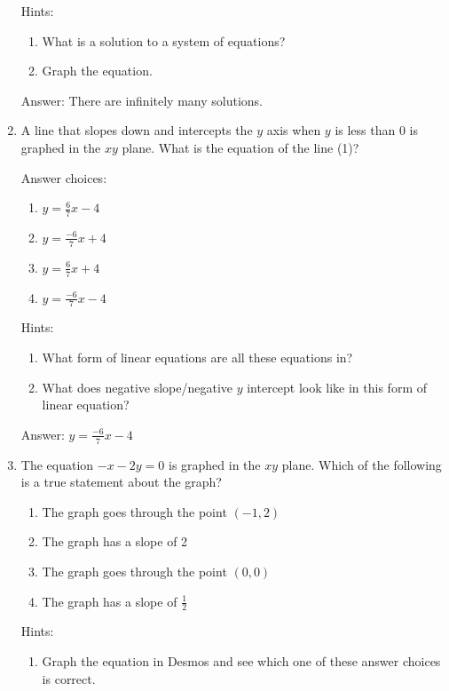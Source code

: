 \documentclass{article}
\begin{document}
\begin{enumerate}
{	      Hints:
	      \begin{enumerate}
		      \item{What is a solution to a system of equations?}
		      \item {Graph the equation.}
	      \end{enumerate}

	      Answer: There are infinitely many solutions.
	      }

	\item {A line that slopes down and intercepts the $y$ axis when $y$ is less than $0$ is graphed in the $xy$ plane. What is the equation of the line (1)?

	      Answer choices:
	      \begin{enumerate}
		      \item{\(y=\frac{6}{7}x-4\)}
		      \item{\(y=\frac{-6}{7}x+4\)}
		      \item{\(y=\frac{6}{7}x+4\)}
		      \item{\(y=\frac{-6}{7}x-4\)}
	      \end{enumerate}

	      Hints:
	      \begin{enumerate}
		      \item{What form of linear equations are all these equations in?}
		      \item {What does negative slope/negative $y$ intercept look like in this form of linear equation?}
	      \end{enumerate}

	      Answer: \(y=\frac{-6}{7}x-4\)}
	\item {The equation \(-x-2y=0\) is graphed in the $xy$ plane. Which of the following is a true statement about the graph?

	      \begin{enumerate}
		      \item {The graph goes through the point $(-1,2)$}
		      \item {The graph has a slope of 2}
		      \item {The graph goes through the point $(0,0)$}
		      \item {The graph has a slope of \(\frac{1}{2}\)}
	      \end{enumerate}

	      Hints:
	      \begin{enumerate}
		      \item{Graph the equation in Desmos and see which one of these answer choices is correct.}
	      \end{enumerate}

}
\end{enumerate}
\end{document}
